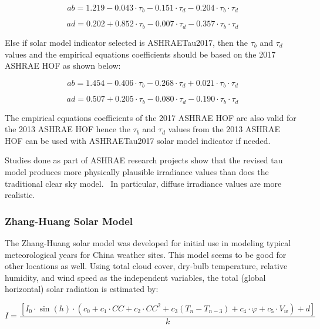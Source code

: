 \begin{equation}
ab = 1.219 - 0.043 \cdot {\tau_b} - 0.151 \cdot {\tau_d} - 0.204 \cdot {\tau_b} \cdot {\tau_d}
\end{equation}

\begin{equation}
ad = 0.202 + 0.852 \cdot {\tau_b} - 0.007 \cdot {\tau_d} - 0.357 \cdot {\tau_b} \cdot {\tau_d}
\end{equation}

Else if solar model indicator selected is ASHRAETau2017, then the $\tau$\(_{b}\) and $\tau$\(_{d}\) values and the empirical equations coefficients should be based on the 2017 ASHRAE HOF as shown below:

\begin{equation}
ab = 1.454 - 0.406 \cdot {\tau_b} - 0.268 \cdot {\tau_d} + 0.021 \cdot {\tau_b} \cdot {\tau_d}
\end{equation}

\begin{equation}
ad = 0.507 + 0.205 \cdot {\tau_b} - 0.080 \cdot {\tau_d} - 0.190 \cdot {\tau_b} \cdot {\tau_d}
\end{equation}

The empirical equations coefficients of the 2017 ASHRAE HOF are also valid for the 2013 ASHRAE HOF hence the $\tau$\(_{b}\) and $\tau$\(_{d}\) values from the 2013 ASHRAE HOF can be used with ASHRAETau2017 solar model indicator if needed.

Studies done as part of ASHRAE research projects show that the revised tau model produces more physically plausible irradiance values than does the traditional clear sky model.~ In particular, diffuse irradiance values are more realistic.

\subsubsection{Zhang-Huang Solar Model}\label{zhang-huang-solar-model}

The Zhang-Huang solar model was developed for initial use in modeling typical meteorological years for China weather sites. This model seems to be good for other locations as well. Using total cloud cover, dry-bulb temperature, relative humidity, and wind speed as the independent variables, the total (global horizontal) solar radiation is estimated by:

\begin{equation}
I = \frac{{\left[ {{I_0}\cdot \sin (h)\cdot \left( {{c_0} + {c_1}\cdot CC + {c_2}\cdot C{C^2} + {c_3}\left( {{T_n} - {T_{n - 3}}} \right) + {c_4}\cdot \varphi  + {c_5}\cdot {V_w}} \right) + d} \right]}}{k}
\end{equation}

